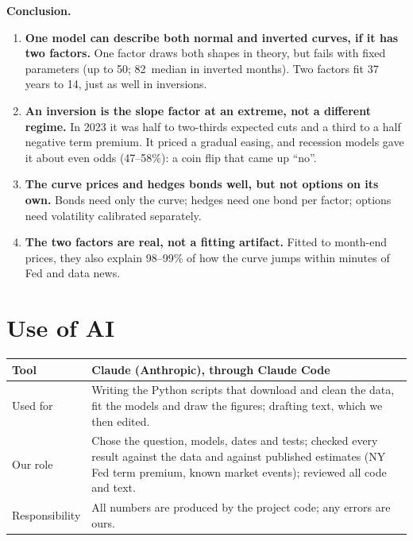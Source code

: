 \begin{keybox}
\textbf{Conclusion.}
\begin{enumerate}
  \item \textbf{One model can describe both normal and inverted curves, if it has two factors.} One factor draws both shapes in theory, but fails with fixed parameters (up to 50\bp; 82\bp\ median in inverted months). Two factors fit 37 years to 14\bp, just as well in inversions.
  \item \textbf{An inversion is the slope factor at an extreme, not a different regime.} In 2023 it was half to two-thirds expected cuts and a third to a half negative term premium. It priced a gradual easing, and recession models gave it about even odds (47--58\%): a coin flip that came up ``no''.
  \item \textbf{The curve prices and hedges bonds well, but not options on its own.} Bonds need only the curve; hedges need one bond per factor; options need volatility calibrated separately.
  \item \textbf{The two factors are real, not a fitting artifact.} Fitted to month-end prices, they also explain 98--99\% of how the curve jumps within minutes of Fed and data news.
\end{enumerate}
\end{keybox}

{\small

}

\section*{Use of AI}
{\small\noindent
\begin{tabularx}{\columnwidth}{@{}p{}X@{}}
\toprule
Tool & Claude (Anthropic), through Claude Code \\
\midrule
Used for & Writing the Python scripts that download and clean the data, fit the models and draw the figures; drafting text, which we then edited. \\
Our role & Chose the question, models, dates and tests; checked every result against the data and against published estimates (NY Fed term premium, known market events); reviewed all code and text. \\
Responsibility & All numbers are produced by the project code; any errors are ours. \\
\bottomrule
\end{tabularx}}


